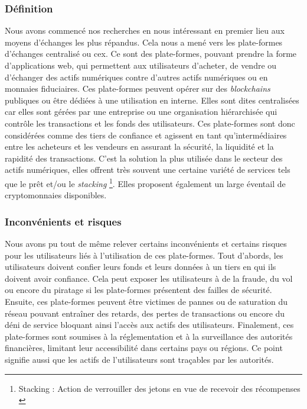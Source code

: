 \subsubsection{Définition}
Nous avons commencé nos recherches en nous intéressant en premier lieu aux moyens d'échanges les plus répandus. 
Cela nous a mené vers les plate-formes d'échanges centralisé ou \acrshort{cex}. 
Ce sont des plate-formes, pouvant prendre la forme d'applications web, qui permettent aux utilisateurs d'acheter, de vendre ou d'échanger des \gls{actif}s numériques contre d'autres \gls{actif}s numériques ou en monnaies fiduciaires. 
Ces plate-formes peuvent opérer sur des \textit{\gls{blockchain}s} publiques ou être dédiées à une utilisation en interne. 
Elles sont dites centralisées car elles sont gérées par une entreprise ou une organisation hiérarchisée qui contrôle les transactions et les fonds des utilisateurs.
Ces plate-formes sont donc considérées comme des tiers de confiance et agissent en tant qu'intermédiaires entre les acheteurs et les vendeurs en assurant la sécurité, la liquidité et la rapidité des transactions.
C'est la solution la plus utilisée dans le secteur des \gls{actif}s numériques, elles offrent très souvent une certaine variété de services tels que le prêt et/ou le \textit{stacking} \footnote{Stacking : Action de verrouiller des jetons en vue de recevoir des récompenses \cite{defStack}}.
Elles proposent également un large éventail de cryptomonnaies disponibles.

\subsubsection{Inconvénients et risques}
Nous avons pu tout de même relever certains inconvénients et certains risques pour les utilisateurs liés à l'utilisation de ces plate-formes. 
Tout d'abords, les utilisateurs doivent confier leurs fonds et leurs données à un tiers en qui ils doivent avoir confiance. 
Cela peut exposer les utilisateurs à de la fraude, du vol ou encore du piratage si les plate-formes présentent des failles de sécurité. \\
Ensuite, ces plate-formes peuvent être victimes de pannes ou de saturation du réseau pouvant entraîner des retards, des pertes de transactions ou encore du déni de service bloquant ainsi l'accès aux \gls{actif}s des utilisateurs. 
Finalement, ces plate-formes sont soumises à la réglementation et à la surveillance des autorités financières, limitant leur accessibilité dans certains pays ou régions. 
Ce point signifie aussi que les \gls{actif}s de l'utilisateurs sont traçables par les autorités. 


